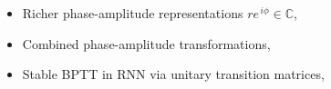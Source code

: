 \documentclass{beamer}
\newcommand{\real}{\mathbb{R}}
\newcommand{\cplx}{\mathbb{C}}
\begin{document}
\begin{frame}[c]{\insertsection}


  \bigskip
  \begin{itemize}
    \item Richer phase-amplitude representations $
      r e^{\,i \phi} \in \cplx
    $, \citep{reichert_neuronal_2014}
    \item Combined phase-amplitude transformations,
      \citep{hirose_generalization_2012}
    \item Stable BPTT in RNN via unitary transition matrices,
      \citep{arjovsky_unitary_2016,wisdom_full-capacity_2016}
  \end{itemize}

\end{frame}
\end{document}
